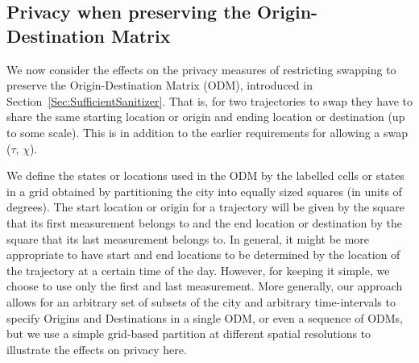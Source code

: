 \documentclass[times,twocolumn,final,authoryear]{elsarticle}
\begin{document}



\subsection{Privacy when preserving the Origin-Destination Matrix}\label{S:PrivacyODM}
We now consider the effects on the privacy measures of restricting 
swapping to preserve the Origin-Destination Matrix (ODM), introduced in Section~\ref{Sec:SufficientSanitizer}. That is, for two trajectories to
swap they have to share the same starting location or origin and ending location or destination (up to some scale).  
This is in addition to the earlier requirements for allowing a swap ($\tau$, $\chi$).

We define the states or locations used in the ODM by the labelled cells or states in a grid obtained by partitioning the
city into equally sized squares (in units of degrees).  
%
The start location or origin for a trajectory will be given by the square that its first
measurement belongs to and the end location or destination by the square that its last
measurement belongs to. 
In general, it might be more appropriate to
have start and end locations to be determined by the location of the
trajectory at a certain time of the day. 
However, for keeping it
simple, we choose to use only the first and last measurement.
More generally, our approach allows for an arbitrary set of subsets of the city and arbitrary time-intervals to specify Origins and Destinations in a single ODM, or even a sequence of ODMs, but we use a simple grid-based partition at different spatial resolutions to illustrate the effects on privacy here.  
\end{document}

